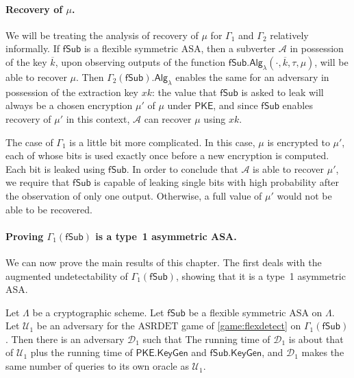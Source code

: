 \paragraph{Recovery of $\mu$.} We will be treating the analysis of recovery of $\mu$ for $\Gamma_1$ and $\Gamma_2$ relatively informally. If $\mathsf{fSub}$ is a flexible symmetric ASA, then a subverter $\mathcal{A}$ in possession of the key $\overline{k}$, upon observing outputs of the function $\mathsf{fSub.Alg}_\lambda(\cdot,\overline{k},\tau,\mu)$, will be able to recover $\mu$. Then $\Gamma_2(\mathsf{fSub})\mathsf{.Alg}_\lambda$ enables the same for an adversary in possession of the extraction key $xk$: the value that $\mathsf{fSub}$ is asked to leak will always be a chosen encryption $\mu'$ of $\mu$ under $\mathsf{PKE}$, and since $\mathsf{fSub}$ enables recovery of $\mu'$ in this context, $\mathcal{A}$ can recover $\mu$ using $xk$.

The case of $\Gamma_1$ is a little bit more complicated. In this case, $\mu$ is encrypted to $\mu'$, each of whose bits is used exactly once before a new encryption is computed. Each bit is leaked using $\mathsf{fSub}$. In order to conclude that $\mathcal{A}$ is able to recover $\mu'$, we require that $\mathsf{fSub}$ is capable of leaking single bits with high probability after the observation of only one output. Otherwise, a full value of $\mu'$ would not be able to be recovered.

\paragraph{Proving $\Gamma_1(\mathsf{fSub})$ is a type~1 asymmetric ASA.}
We can now prove the main results of this chapter. The first deals with the augmented undetectability of $\Gamma_1(\mathsf{fSub})$, showing that it is a type~1 asymmetric ASA.

\begin{theorem} \label{theorem:gen1}
Let $\mathsf{\Lambda}$ be a cryptographic scheme. Let $\mathsf{fSub}$ be a flexible symmetric $\mathrm{ASA}$ on $\mathsf{\Lambda}$. Let $\mathcal{U}_1$ be an adversary for the $\mathrm{ASRDET}$ game of \autoref{game:flexdetect} on $\Gamma_1(\mathsf{fSub})$. Then there is an adversary $\mathcal{D}_1$ such that
The running time of $\mathcal{D}_1$ is about that of $\mathcal{U}_1$ plus the running time of $\mathsf{PKE.KeyGen}$ and $\mathsf{fSub.KeyGen}$, and $\mathcal{D}_1$ makes the same number of queries to its own oracle as $\mathcal{U}_1$.
\end{theorem}

